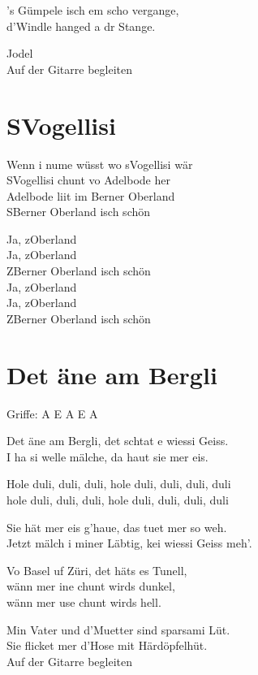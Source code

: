 \documentclass[
  letterpaper,
  twoside=false]{scrbook}
\begin{document}
's Gümpele isch em scho vergange,\\
d'Windle hanged a dr Stange.

Jodel\\
Auf der Gitarre begleiten

\hypertarget{svogellisi}{%
\chapter{S\textquotesingle Vogellisi}\label{svogellisi}}

Wenn i nume wüsst wo s\textquotesingle Vogellisi wär\\
S\textquotesingle Vogellisi chunt vo Adelbode her\\
Adelbode liit im Berner Oberland\\
S\textquotesingle Berner Oberland isch schön

Ja, z\textquotesingle Oberland\\
Ja, z\textquotesingle Oberland\\
Z\textquotesingle Berner Oberland isch schön\\
Ja, z\textquotesingle Oberland\\
Ja, z\textquotesingle Oberland\\
Z\textquotesingle Berner Oberland isch schön

\hypertarget{det-uxe4ne-am-bergli}{%
\chapter{Det äne am Bergli}\label{det-uxe4ne-am-bergli}}

Griffe: A E A E A

Det äne am Bergli, det schtat e wiessi Geiss.\\
I ha si welle mälche, da haut sie mer eis.

Hole duli, duli, duli, hole duli, duli, duli, duli\\
hole duli, duli, duli, hole duli, duli, duli, duli

Sie hät mer eis g'haue, das tuet mer so weh.\\
Jetzt mälch i miner Läbtig, kei wiessi Geiss meh'.

Vo Basel uf Züri, det häts es Tunell,\\
wänn mer ine chunt wirds dunkel,\\
wänn mer use chunt wirds hell.

Min Vater und d'Muetter sind sparsami Lüt.\\
Sie flicket mer d'Hose mit Härdöpfelhüt.\\
Auf der Gitarre begleiten


\backmatter
\end{document}
